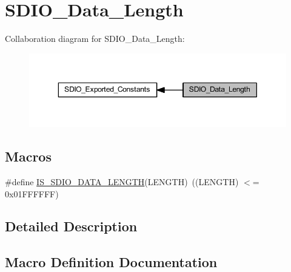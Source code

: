 \hypertarget{group___s_d_i_o___data___length}{}\section{S\+D\+I\+O\+\_\+\+Data\+\_\+\+Length}
\label{group___s_d_i_o___data___length}
Collaboration diagram for S\+D\+I\+O\+\_\+\+Data\+\_\+\+Length\+:
\nopagebreak
\begin{figure}[H]
\begin{center}
\leavevmode
\includegraphics[width=350pt]{group___s_d_i_o___data___length}
\end{center}
\end{figure}
\subsection*{Macros}
\begin{DoxyCompactItemize}
\item 
\#define \hyperlink{group___s_d_i_o___data___length_ga57dd64db3f69d18625ea8ca82c009fad}{I\+S\+\_\+\+S\+D\+I\+O\+\_\+\+D\+A\+T\+A\+\_\+\+L\+E\+N\+G\+TH}(L\+E\+N\+G\+TH)~((L\+E\+N\+G\+TH) $<$= 0x01\+F\+F\+F\+F\+F\+F)
\end{DoxyCompactItemize}


\subsection{Detailed Description}


\subsection{Macro Definition Documentation}
\mbox{\label{group___s_d_i_o___data___length_ga57dd64db3f69d18625ea8ca82c009fad}} 
